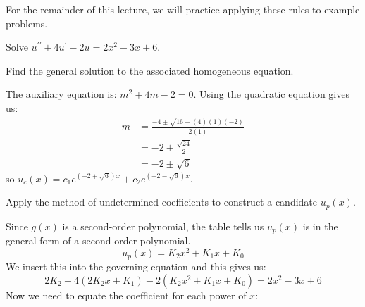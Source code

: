 For the remainder of this lecture, we will practice applying these rules to example problems.

\vspace{0.5cm}

 Solve $u^{\prime \prime}+4u^{\prime}-2u = 2x^2 - 3x + 6$.

\vspace{0.25cm}
 Find the general solution to the associated homogeneous equation.

\vspace{0.25cm}

\noindent The auxiliary equation is: $m^2 + 4m-2=0$.  Using the quadratic equation gives us: 
\begin{align*}
m &= \frac{-4 \pm \sqrt{16 - (4)(1)(-2)}}{2(1)} \\
&= -2 \pm \frac{\sqrt{24}}{2} \\
&= -2 \pm \sqrt{6}
\end{align*}
so $u_c(x) = c_1e^{(-2+\sqrt{6})x}+c_2e^{(-2-\sqrt{6})x}$.

\vspace{3.0cm}
 Apply the method of undetermined coefficients to construct a candidate $u_p(x)$.

\vspace{0.25cm}

\noindent Since $g(x)$ is a second-order polynomial, the table tells us $u_p(x)$ is in the general form of a second-order polynomial.
$$u_p(x) = K_2x^2+K_1x+K_0$$
We insert this into the governing equation and this gives us:
\begin{equation*}
2K_2 + 4(2K_2x+K_1) - 2(K_2x^2+K_1x+K_0) = 2x^2-3x+6
\end{equation*}
Now we need to equate the coefficient for each power of $x$:

